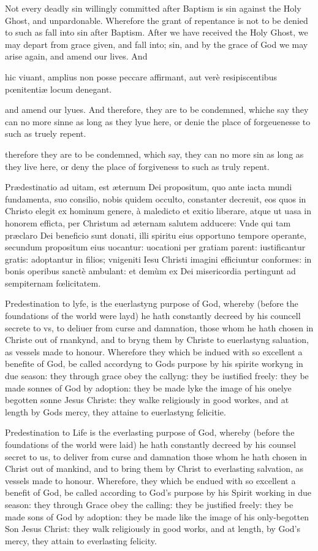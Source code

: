 Not every deadly sin willingly committed after Baptism is sin against the Holy Ghost, and unpardonable. Wherefore the grant of repentance is not to be denied to such as fall into sin after Baptism. After we have received the Holy Ghost, we may depart from grace given, and fall into; sin, and by the grace of God we may arise again, and amend our lives. And

hic viuant, amplius non posse peccare affirmant, aut verè resipiscentibus pœnitentiæ locum denegant.

and amend our lyues. And therefore, they are to be condemned, whiche say they can no more sinne as long as they lyue here, or denie the place of forgeuenesse to such as truely repent.

therefore they are to be condemned, which say, they can no more sin as long as they live here, or deny the place of forgiveness to such as truly repent.


Prædestinatio ad uitam, est æternum Dei propositum, quo ante iacta mundi fundamenta, suo consilio, nobis quidem occulto, constanter decreuit, eos quos in Christo elegit ex hominum genere, à maledicto et exitio liberare, atque ut uasa in honorem efficta, per Christum ad æternam salutem adducere: Vnde qui tam præclaro Dei beneficio sunt donati, illi spiritu eius opportuno tempore operante, secundum propositum eius uocantur: uocationi per gratiam parent: iustificantur gratis: adoptantur in filios; vnigeniti Iesu Christi imagini efficiuntur conformes: in bonis operibus sanctè ambulant: et demùm ex Dei misericordia pertingunt ad sempiternam fœlicitatem.

Predestination to lyfe, is the euerlastyng purpose of God, whereby (before the foundations of the world were layd) he hath constantly decreed by his councell secrete to vs, to deliuer from curse and damnation, those whom he hath chosen in Christe out of rnankynd, and to bryng them by Christe to euerlastyng saluation, as vessels made to honour. Wherefore they which be indued with so excellent a benefite of God, be called accordyng to Gods purpose by his spirite workyng in due season: they through grace obey the callyng: they be iustified freely: they be made sonnes of God by adoption: they be made lyke the image of his onelye begotten sonne Jesus Christe: they walke religiously in good workes, and at length by Gods mercy, they attaine to euerlastyng felicitie.

Predestination to Life is the everlasting purpose of God, whereby (before the foundations of the world were laid) he hath constantly decreed by his counsel secret to us, to deliver from curse and damnation those whom he hath chosen in Christ out of mankind, and to bring them by Christ to everlasting salvation, as vessels made to honour. Wherefore, they which be endued with so excellent a benefit of God, be called according to God's purpose by his Spirit working in due season: they through Grace obey the calling: they be justified freely: they be made sons of God by adoption: they be made like the image of his only-begotten Son Jesus Christ: they walk religiously in good works, and at length, by God's mercy, they attain to everlasting felicity.

